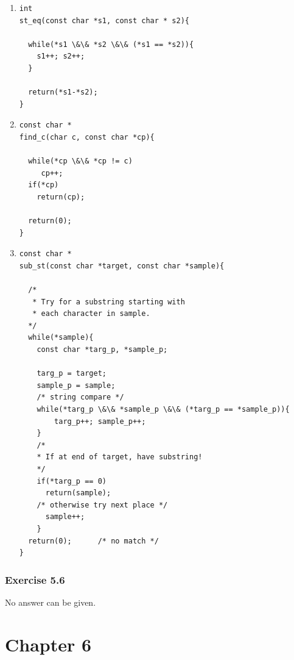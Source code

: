   \begin{enumerate}

    \item 
     \begin{Verbatim}
int
st_eq(const char *s1, const char * s2){

  while(*s1 \&\& *s2 \&\& (*s1 == *s2)){
    s1++; s2++;
  }

  return(*s1-*s2);
}
\end{Verbatim}

    

    \item 
     \begin{Verbatim}
const char *
find_c(char c, const char *cp){

  while(*cp \&\& *cp != c)
     cp++;
  if(*cp)
    return(cp);

  return(0);
}
\end{Verbatim}

    

    \item 
     \begin{Verbatim}
const char *
sub_st(const char *target, const char *sample){

  /*
   * Try for a substring starting with
   * each character in sample.
  */
  while(*sample){
    const char *targ_p, *sample_p;

    targ_p = target;
    sample_p = sample;
    /* string compare */
    while(*targ_p \&\& *sample_p \&\& (*targ_p == *sample_p)){
        targ_p++; sample_p++;
    }
    /*
    * If at end of target, have substring!
    */
    if(*targ_p == 0)
      return(sample);
    /* otherwise try next place */
      sample++;
    }
  return(0);      /* no match */
}
\end{Verbatim}

    

   \end{enumerate}

  

  \subsubsection*{Exercise 5.6}

   No answer can be given.


  

 
        \section*{Chapter 6}
        

